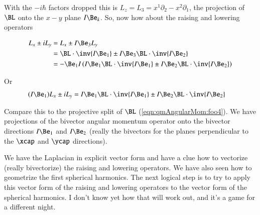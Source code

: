 With the $-i\hbar$ factors dropped this is $L_z = L_3 = x^1 \partial_2 - x^2 \partial_1$, the projection of $\BL$ onto the $x-y$ plane $I \Be_k$.  So, now how about the raising and lowering operators

\begin{align*}
L_x \pm i L_y
&=
L_x \pm I \Be_3 L_y \\
&=
\BL \cdot \inv{I\Be_1} \pm I \Be_3 \BL \cdot \inv{I\Be_2} \\
&=
-\Be_1 I \left( I \Be_1 \BL \cdot \inv{I\Be_1} \pm I \Be_2 \BL \cdot \inv{I\Be_2} \right) \\
\end{align*}

Or
\begin{align}\label{eqn:qmAngularMom:foo5}
(I \Be_1) L_x \pm i L_y &= I \Be_1 \BL \cdot \inv{I\Be_1} \pm I \Be_2 \BL \cdot \inv{I\Be_2} 
\end{align}

Compare this to the projective split of $\BL$ (\ref{eqn:qmAngularMom:foo4}).  We have projections of the bivector angular momentum operator onto the bivector directions $I\Be_1$ and $I\Be_2$ (really the bivectors for the planes perpendicular to the $\xcap$ and $\ycap$ directions).

We have the Laplacian in explicit vector form and have a clue how to vectorize (really bivectorize) the raising and lowering operators.  We have also seen how to geometrize the first spherical harmonics.  The next logical step is to try to apply this vector form of the raising and lowering operators to the vector form of the spherical harmonics.  I don't know yet how that will work out, and it's a game for a different night.

\EndArticle
